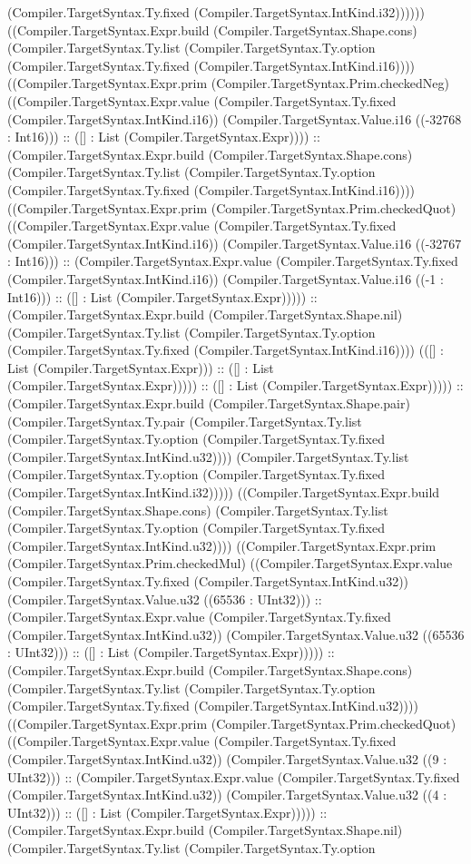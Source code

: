 \documentclass[11pt]{article}
\begin{document}
(Compiler.TargetSyntax.Ty.fixed (Compiler.TargetSyntax.IntKind.i32)))))) ((Compiler.TargetSyntax.Expr.build (Compiler.TargetSyntax.Shape.cons) (Compiler.TargetSyntax.Ty.list (Compiler.TargetSyntax.Ty.option (Compiler.TargetSyntax.Ty.fixed (Compiler.TargetSyntax.IntKind.i16)))) ((Compiler.TargetSyntax.Expr.prim (Compiler.TargetSyntax.Prim.checkedNeg) ((Compiler.TargetSyntax.Expr.value (Compiler.TargetSyntax.Ty.fixed (Compiler.TargetSyntax.IntKind.i16)) (Compiler.TargetSyntax.Value.i16 ((-32768 : Int16))) :: ([] : List (Compiler.TargetSyntax.Expr)))) :: (Compiler.TargetSyntax.Expr.build (Compiler.TargetSyntax.Shape.cons) (Compiler.TargetSyntax.Ty.list (Compiler.TargetSyntax.Ty.option (Compiler.TargetSyntax.Ty.fixed (Compiler.TargetSyntax.IntKind.i16)))) ((Compiler.TargetSyntax.Expr.prim (Compiler.TargetSyntax.Prim.checkedQuot) ((Compiler.TargetSyntax.Expr.value (Compiler.TargetSyntax.Ty.fixed (Compiler.TargetSyntax.IntKind.i16)) (Compiler.TargetSyntax.Value.i16 ((-32767 : Int16))) :: (Compiler.TargetSyntax.Expr.value (Compiler.TargetSyntax.Ty.fixed (Compiler.TargetSyntax.IntKind.i16)) (Compiler.TargetSyntax.Value.i16 ((-1 : Int16))) :: ([] : List (Compiler.TargetSyntax.Expr))))) :: (Compiler.TargetSyntax.Expr.build (Compiler.TargetSyntax.Shape.nil) (Compiler.TargetSyntax.Ty.list (Compiler.TargetSyntax.Ty.option (Compiler.TargetSyntax.Ty.fixed (Compiler.TargetSyntax.IntKind.i16)))) (([] : List (Compiler.TargetSyntax.Expr))) :: ([] : List (Compiler.TargetSyntax.Expr))))) :: ([] : List (Compiler.TargetSyntax.Expr))))) :: (Compiler.TargetSyntax.Expr.build (Compiler.TargetSyntax.Shape.pair) (Compiler.TargetSyntax.Ty.pair (Compiler.TargetSyntax.Ty.list (Compiler.TargetSyntax.Ty.option (Compiler.TargetSyntax.Ty.fixed (Compiler.TargetSyntax.IntKind.u32)))) (Compiler.TargetSyntax.Ty.list (Compiler.TargetSyntax.Ty.option (Compiler.TargetSyntax.Ty.fixed (Compiler.TargetSyntax.IntKind.i32))))) ((Compiler.TargetSyntax.Expr.build (Compiler.TargetSyntax.Shape.cons) (Compiler.TargetSyntax.Ty.list (Compiler.TargetSyntax.Ty.option (Compiler.TargetSyntax.Ty.fixed (Compiler.TargetSyntax.IntKind.u32)))) ((Compiler.TargetSyntax.Expr.prim (Compiler.TargetSyntax.Prim.checkedMul) ((Compiler.TargetSyntax.Expr.value (Compiler.TargetSyntax.Ty.fixed (Compiler.TargetSyntax.IntKind.u32)) (Compiler.TargetSyntax.Value.u32 ((65536 : UInt32))) :: (Compiler.TargetSyntax.Expr.value (Compiler.TargetSyntax.Ty.fixed (Compiler.TargetSyntax.IntKind.u32)) (Compiler.TargetSyntax.Value.u32 ((65536 : UInt32))) :: ([] : List (Compiler.TargetSyntax.Expr))))) :: (Compiler.TargetSyntax.Expr.build (Compiler.TargetSyntax.Shape.cons) (Compiler.TargetSyntax.Ty.list (Compiler.TargetSyntax.Ty.option (Compiler.TargetSyntax.Ty.fixed (Compiler.TargetSyntax.IntKind.u32)))) ((Compiler.TargetSyntax.Expr.prim (Compiler.TargetSyntax.Prim.checkedQuot) ((Compiler.TargetSyntax.Expr.value (Compiler.TargetSyntax.Ty.fixed (Compiler.TargetSyntax.IntKind.u32)) (Compiler.TargetSyntax.Value.u32 ((9 : UInt32))) :: (Compiler.TargetSyntax.Expr.value (Compiler.TargetSyntax.Ty.fixed (Compiler.TargetSyntax.IntKind.u32)) (Compiler.TargetSyntax.Value.u32 ((4 : UInt32))) :: ([] : List (Compiler.TargetSyntax.Expr))))) :: (Compiler.TargetSyntax.Expr.build (Compiler.TargetSyntax.Shape.nil) (Compiler.TargetSyntax.Ty.list (Compiler.TargetSyntax.Ty.option 
\end{document}
